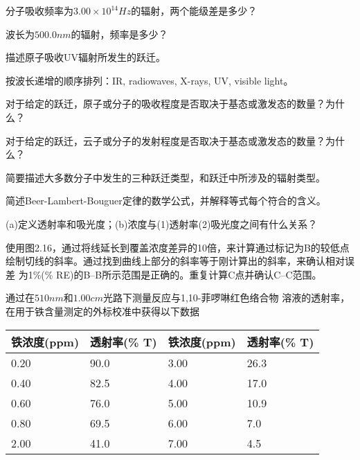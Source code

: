 \newpage
\begin{problemset}
\item 分子吸收频率为$3.00\times 10^{14} Hz$的辐射，两个能级差是多少？
\item 波长为$500.0 nm$的辐射，频率是多少？
\item 描述原子吸收UV辐射所发生的跃迁。
\item 按波长递增的顺序排列：IR, radiowaves, X-rays, UV, visible light。
\item 对于给定的跃迁，原子或分子的吸收程度是否取决于基态或激发态的数量？为什么？
\item 对于给定的跃迁，云子或分子的发射程度是否取决于基态或激发态的数量？为什么？
\item 简要描述大多数分子中发生的三种跃迁类型，和跃迁中所涉及的辐射类型。
\item 简述Beer-Lambert-Bouguer定律的数学公式，并解释等式每个符合的含义。
\item (a)定义透射率和吸光度；(b)浓度与(1)透射率(2)吸光度之间有什么关系？
\item 使用图2.16，通过将线延长到覆盖浓度差异的10倍，来计算通过标记为B的较低点
    绘制切线的斜率。通过找到曲线上部分的斜率等于刚计算出的斜率，来确认相对误差
    为1\%(\% RE)的B--B所示范围是正确的。重复计算C点并确认C--C范围。
\item 通过在$510 nm$和$1.00 cm$光路下测量反应与1,10-菲啰啉红色络合物
    溶液的透射率，在用于铁含量测定的外标校准中获得以下数据
    \begin{table}[htbp]
        \centering
        \begin{tabular}{llll}
            \hline
            铁浓度(ppm)&透射率(\% T)&铁浓度(ppm)&透射率(\% T)\\
            \hline
            0.20 & 90.0 & 3.00 & 26.3 \\
            0.40 & 82.5 & 4.00 & 17.0 \\
            0.60 & 76.0 & 5.00 & 10.9 \\
            0.80 & 69.5 & 6.00 & 7.0 \\
            2.00 & 41.0 & 7.00 & 4.5 \\
            \hline
        \end{tabular}
    \end{table}


\end{problemset}
